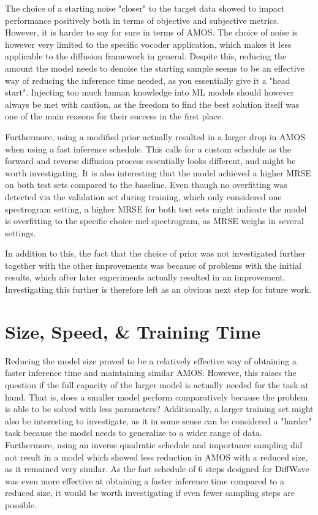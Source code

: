 \documentclass{report}
\begin{document}
The choice of a starting noise "closer" to the target data showed to impact performance positively both in terms of objective and subjective metrics. However, it is harder to say for sure in terms of AMOS. The choice of noise is however very limited to the specific vocoder application, which makes it less applicable to the diffusion framework in general. Despite this, reducing the amount the model needs to denoise the starting sample seems to be an effective way of reducing the inference time needed, as you essentially give it a "head start". Injecting too much human knowledge into ML models should however always be met with caution, as the freedom to find the best solution itself was one of the main reasons for their success in the first place.

Furthermore, using a modified prior actually resulted in a larger drop in AMOS when using a fast inference schedule. This calls for a custom schedule as the forward and reverse diffusion process essentially looks different, and might be worth investigating. It is also interesting that the model achieved a higher MRSE on both test sets compared to the baseline. Even though no overfitting was detected via the validation set during training, which only considered one spectrogram setting, a higher MRSE for both test sets might indicate the model is overfitting to the specific choice mel spectrogram, as MRSE weighs in several settings.

In addition to this, the fact that the choice of prior was not investigated further together with the other improvements was because of problems with the initial results, which after later experiments actually resulted in an improvement. Investigating this further is therefore left as an obvious next step for future work.

\section{Size, Speed, \& Training Time}

Reducing the model size proved to be a relatively effective way of obtaining a faster inference time and maintaining similar AMOS. However, this raises the question if the full capacity of the larger model is actually needed for the task at hand. That is, does a smaller model perform comparatively because the problem is able to be solved with less parameters? Additionally, a larger training set might also be interesting to investigate, as it in some sense can be considered a "harder" task because the model needs to generalize to a wider range of data. Furthermore, using an inverse quadratic schedule and importance sampling did not result in a model which showed less reduction in AMOS with a reduced size, as it remained very similar. As the fast schedule of 6 steps designed for DiffWave was even more effective at obtaining a faster inference time compared to a reduced size, it would be worth investigating if even fewer sampling steps are possible.
\end{document}
